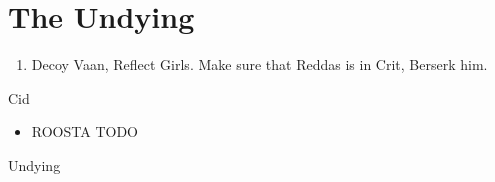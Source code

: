 \chapter{The Undying}
\begin{enumerate}
\item Decoy Vaan, Reflect Girls. Make sure that Reddas is in Crit, Berserk him.
\end{enumerate}
\begin{gambit}
\begin{itemize}
\end{itemize}
\end{gambit}
\begin{battle}{Cid}
\begin{itemize}
\item ROOSTA TODO
\end{itemize}
\end{battle}
\begin{battle}{Undying}

\end{battle}